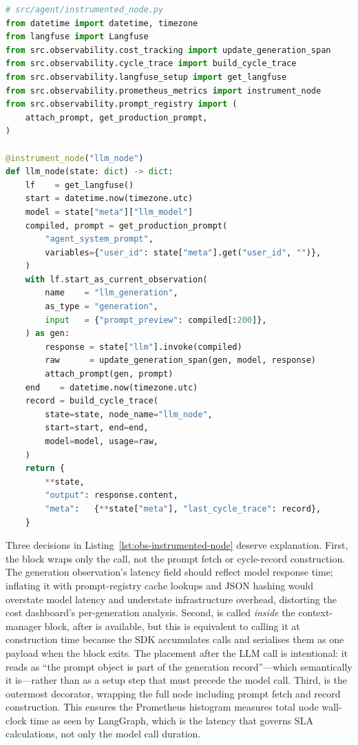\begin{lstlisting}[language=Python,
  caption={A fully instrumented LangGraph node; all layers applied
  without coupling},
  label={lst:obs-instrumented-node}]
# src/agent/instrumented_node.py
from datetime import datetime, timezone
from langfuse import Langfuse
from src.observability.cost_tracking import update_generation_span
from src.observability.cycle_trace import build_cycle_trace
from src.observability.langfuse_setup import get_langfuse
from src.observability.prometheus_metrics import instrument_node
from src.observability.prompt_registry import (
    attach_prompt, get_production_prompt,
)

@instrument_node("llm_node")
def llm_node(state: dict) -> dict:
    lf    = get_langfuse()
    start = datetime.now(timezone.utc)
    model = state["meta"]["llm_model"]
    compiled, prompt = get_production_prompt(
        "agent_system_prompt",
        variables={"user_id": state["meta"].get("user_id", "")},
    )
    with lf.start_as_current_observation(
        name    = "llm_generation",
        as_type = "generation",
        input   = {"prompt_preview": compiled[:200]},
    ) as gen:
        response = state["llm"].invoke(compiled)
        raw      = update_generation_span(gen, model, response)
        attach_prompt(gen, prompt)
    end    = datetime.now(timezone.utc)
    record = build_cycle_trace(
        state=state, node_name="llm_node",
        start=start, end=end,
        model=model, usage=raw,
    )
    return {
        **state,
        "output": response.content,
        "meta":   {**state["meta"], "last_cycle_trace": record},
    }
\end{lstlisting}

Three decisions in Listing~\ref{lst:obs-instrumented-node} deserve
explanation. First, the 
block wraps only the  call, not the
prompt fetch or cycle-record construction. The generation observation's
latency field should reflect model response time; inflating it with
prompt-registry cache lookups and JSON hashing would overstate model
latency and understate infrastructure overhead, distorting the cost
dashboard's per-generation analysis. Second,  is
called \emph{inside} the context-manager block, after 
is available, but this is equivalent to calling it at construction time
because the SDK accumulates  calls and serialises them
as one payload when the block exits. The placement after the LLM call
is intentional: it reads as ``the prompt object is part of the
generation record''---which semantically it is---rather than as a
setup step that must precede the model call. Third, 
is the outermost decorator, wrapping the full node including prompt
fetch and record construction. This ensures the Prometheus histogram
measures total node wall-clock time as seen by LangGraph, which is the
latency that governs SLA calculations, not only the model call duration.

